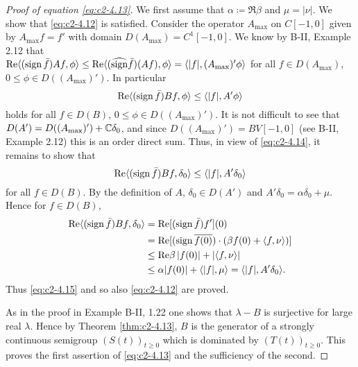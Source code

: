 \begin{proof}[Proof of equation \eqref{eq:c2-4.13}]
We first assume that $\alpha \coloneqq \Re  \beta$ and $\mu = |\nu|$.
We show that \eqref{eq:c2-4.12} is satisfied.
Consider the operator $A_{\max}$ on $C[-1,0]$ given by $A_{\max}f = f'$ with domain $D(A_{\max}) = C^{1}[-1,0]$.
We know by B-II, Example 2.12 
that \\ $\mathop{}\!\mathrm{Re}\langle(\operatorname{sign}  \bar{f})Af,\phi\rangle \leq \mathop{}\!\mathrm{Re}\langle(\widehat{\operatorname{sign}}  \bar{f})(Af),\phi\rangle = \langle|f|, (A_{\max})'\phi\rangle$ for all $f \in D(A_{\max})$, $0 \leq \phi \in D((A_{\max})')$.
In particular
\begin{equation}\label{eq:c2-4.14}
\mathop{}\!\mathrm{Re}\langle(\operatorname{sign}  \bar{f})Bf,\phi\rangle \leq \langle|f|,A'\phi\rangle
\end{equation}
holds for all $f \in D(B)$, $0 \leq \phi \in D((A_{\max})')$.
It is not difficult to see that $D(A') = D((A_{\max})') + \mathbb{C}\delta_{0}$, and since $D((A_{\max})') = BV[-1,0]$
(see B-II, Example 2.12)
this is an order direct sum.
Thus, in view of \eqref{eq:c2-4.14}, it remains to show that
\begin{equation}\label{eq:c2-4.15}
\mathop{}\!\mathrm{Re}\langle(\operatorname{sign}  \bar{f})Bf,\delta_{0}\rangle \leq \langle|f|,A'\delta_{0}\rangle
\end{equation}
for all $f \in D(B)$.
By the definition of $A$, $\delta_{0} \in D(A')$ and $A'\delta_{0} =  \alpha\delta_{0} + \mu$.
Hence for $f \in D(B)$,
\begin{align*}
\mathop{}\!\mathrm{Re}\langle(\operatorname{sign} \bar{f})Bf,\delta_{0}\rangle &= \mathop{}\!\mathrm{Re}[(\operatorname{sign} \bar{f})f'](0) \\
&= \mathop{}\!\mathrm{Re}[(\operatorname{sign}  \overline{f(0)})\cdot(\beta f(0) +  \langle f,\nu\rangle)] \\
&\leq \mathop{}\!\mathrm{Re}\beta \, |f(0)| + |\langle f,\nu\rangle| \\
&\leq \alpha|f(0)| + \langle|f|,\mu\rangle = \langle|f|,A'\delta_{0}\rangle.
\end{align*}
Thus \eqref{eq:c2-4.15} and so also \eqref{eq:c2-4.12} are proved.

As in the proof in Example B-II, 1.22 one shows that $\lambda - B$ is surjective for large real $\lambda$.
Hence by Theorem \ref{thm:c2-4.13}, $B$ is the generator of a
strongly continuous semigroup $(S(t))_{t \geq 0}$ which is dominated by
$(T(t))_{t \geq 0}$.
This proves the first assertion of \eqref{eq:c2-4.13} and the sufficiency of the second.


\end{proof}
